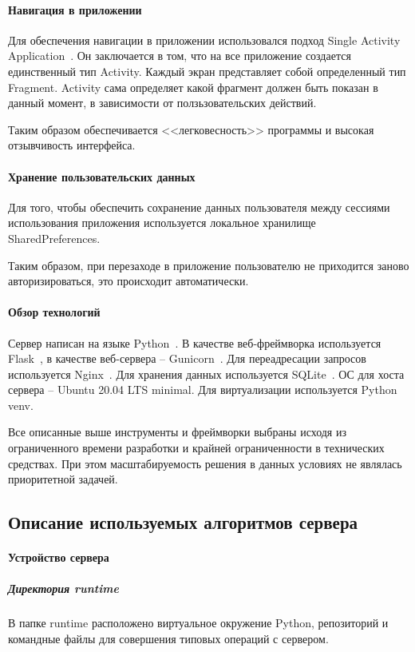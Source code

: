 \documentclass[explnote]{espd}
\begin{document}
\paragraph{Навигация в приложении}
Для обеспечения навигации в приложении использовался подход Single Activity Application~\cite{SAA}. Он заключается в том, что на все приложение создается единственный тип Activity. Каждый экран представляет собой определенный тип Fragment. Activity сама определяет какой фрагмент должен быть показан в данный момент, в зависимости от ползьзовательских действий. 

Таким образом обеспечивается <<легковесность>> программы и высокая отзывчивость интерфейса.

\paragraph{Хранение пользовательских данных}
Для того, чтобы обеспечить сохранение данных пользователя между сессиями использования приложения используется локальное хранилище SharedPreferences.

Таким образом, при перезаходе в приложение пользователю не приходится заново авторизироваться, это происходит автоматически. 

\paragraph{Обзор технологий}
Сервер написан на языке Python~\cite{python}. В качестве веб-фреймворка используется Flask~\cite{flask}, в качестве веб-сервера -- Gunicorn~\cite{gunicorn}. Для переадресации запросов используется Nginx~\cite{nginx}. Для хранения данных используется SQLite~\cite{sqlite}. ОС для хоста сервера -- Ubuntu 20.04 LTS minimal. Для виртуализации используется Python venv.

Все описанные выше инструменты и фреймворки выбраны исходя из ограниченного времени разработки и крайней ограниченности в технических средствах. При этом масштабируемость решения в данных условиях не являлась приоритетной задачей.

\subsection{Описание используемых алгоритмов сервера}

\paragraph{Устройство сервера}
\subparagraph{Директория runtime}
В папке runtime расположено виртуальное окружение Python, репозиторий и командные файлы для совершения типовых операций с сервером.
\end{document}
